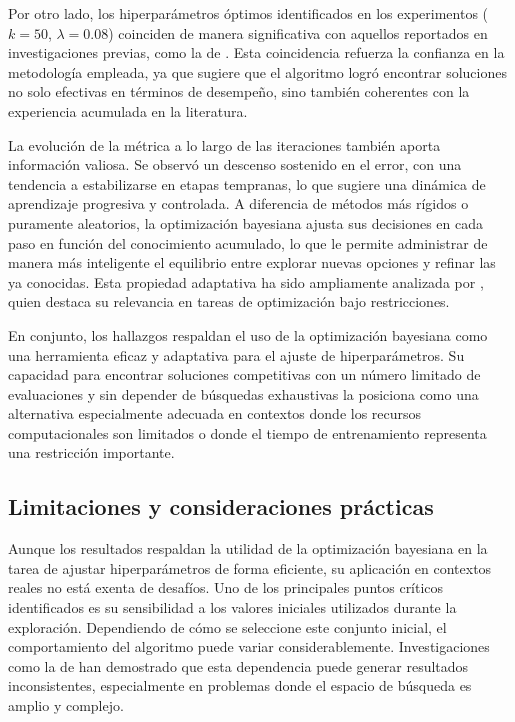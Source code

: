 \documentclass[twocolumn,10pt]{article}
\begin{document}
Por otro lado, los hiperparámetros óptimos identificados en los experimentos ($k = 50$, $\lambda = 0.08$) coinciden de manera significativa con aquellos reportados en investigaciones previas, como la de \citet{koren2009matrix}. Esta coincidencia refuerza la confianza en la metodología empleada, ya que sugiere que el algoritmo logró encontrar soluciones no solo efectivas en términos de desempeño, sino también coherentes con la experiencia acumulada en la literatura.

La evolución de la métrica a lo largo de las iteraciones también aporta información valiosa. Se observó un descenso sostenido en el error, con una tendencia a estabilizarse en etapas tempranas, lo que sugiere una dinámica de aprendizaje progresiva y controlada. A diferencia de métodos más rígidos o puramente aleatorios, la optimización bayesiana ajusta sus decisiones en cada paso en función del conocimiento acumulado, lo que le permite administrar de manera más inteligente el equilibrio entre explorar nuevas opciones y refinar las ya conocidas. Esta propiedad adaptativa ha sido ampliamente analizada por \citet{shahriari2016taking}, quien destaca su relevancia en tareas de optimización bajo restricciones.

En conjunto, los hallazgos respaldan el uso de la optimización bayesiana como una herramienta eficaz y adaptativa para el ajuste de hiperparámetros. Su capacidad para encontrar soluciones competitivas con un número limitado de evaluaciones y sin depender de búsquedas exhaustivas la posiciona como una alternativa especialmente adecuada en contextos donde los recursos computacionales son limitados o donde el tiempo de entrenamiento representa una restricción importante.

\subsection{Limitaciones y consideraciones prácticas}

Aunque los resultados respaldan la utilidad de la optimización bayesiana en la tarea de ajustar hiperparámetros de forma eficiente, su aplicación en contextos reales no está exenta de desafíos. Uno de los principales puntos críticos identificados es su sensibilidad a los valores iniciales utilizados durante la exploración. Dependiendo de cómo se seleccione este conjunto inicial, el comportamiento del algoritmo puede variar considerablemente. Investigaciones como la de \citet{wu2019practical} han demostrado que esta dependencia puede generar resultados inconsistentes, especialmente en problemas donde el espacio de búsqueda es amplio y complejo.
\end{document}
